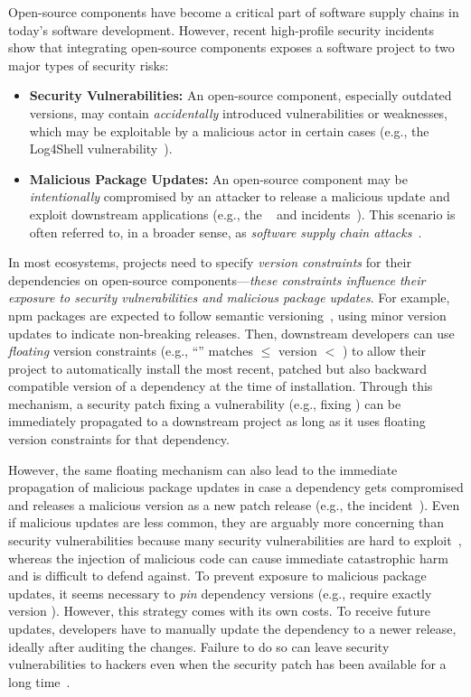 Open-source components have become a critical part of software supply chains in today's software development. 
However, recent high-profile security incidents show that integrating open-source components exposes a software project to two major types of security risks:
\begin{itemize}[leftmargin=20pt]
    \item \textbf{Security Vulnerabilities:} An open-source component, especially outdated versions, may contain \textit{accidentally} introduced vulnerabilities or weaknesses, which may be exploitable by a malicious actor in certain cases (e.g., the Log4Shell vulnerability~\cite{Log4Shell}). 
    \item \textbf{Malicious Package Updates:} An open-source component may be \textit{intentionally} compromised by an attacker to release a malicious update and exploit downstream applications (e.g., the ~\cite{node-ipc} and  incidents~\cite{xz-utils}).
    This scenario is often referred to, in a broader sense, as \emph{software supply chain attacks}~\cite{DBLP:conf/dimva/OhmPS020, DBLP:conf/sp/LadisaPMB23}.
\end{itemize}

In most ecosystems, projects need to specify \emph{version constraints} for their dependencies on open-source components---\textit{these constraints influence their exposure to security vulnerabilities and malicious package updates}. 
For example, npm packages are expected to follow semantic versioning~\cite{semver}, using minor version updates to indicate non-breaking releases.
Then, downstream developers can use \emph{floating} version constraints (e.g., ``'' matches  $\le$ version $<$ ) to allow their project to automatically install the most recent, patched but also backward compatible version of a dependency at the time of installation.
Through this mechanism, a security patch fixing a vulnerability (e.g.,  fixing ) can be immediately propagated to a downstream project as long as it uses floating version constraints for that dependency.

However, the same floating mechanism can also lead to the immediate propagation of malicious package updates in case a dependency gets compromised and releases a malicious version as a new patch release (e.g., the  incident~\cite{node-ipc}).
Even if malicious updates are less common, they are arguably more concerning than security vulnerabilities because many security vulnerabilities are hard to exploit~\cite{DBLP:conf/codaspy/YounisMAR16, DBLP:journals/corr/abs-1908-04856}, whereas the injection of malicious code can cause immediate catastrophic harm and is difficult to defend against.
To prevent exposure to malicious package updates, it seems necessary to \emph{pin} dependency versions (e.g., require exactly version ). However, this strategy comes with its own costs.
To receive future updates, developers have to manually update the dependency to a newer release, ideally after auditing the changes. 
Failure to do so can leave security vulnerabilities to hackers even when the security patch has been available for a long time~\cite{DBLP:conf/msr/DecanMC18}.

